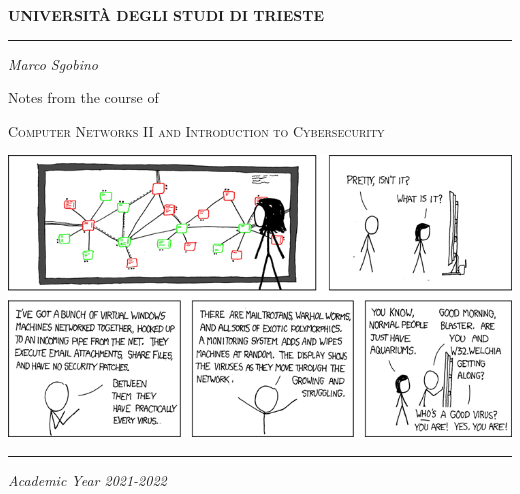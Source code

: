 \begin{titlepage}
        \begin{center}
                \Large
                \textbf{UNIVERSITÀ DEGLI STUDI DI TRIESTE}

                \par\noindent\rule{\textwidth}{0.8pt}
                \vspace*{0.6cm}

                \large
                \emph{Marco Sgobino}

                \large
                \vspace*{0.6cm}

                \Large Notes from the course of
                \vspace*{0.6cm}

                \Huge
                \textsc{Computer Networks II and Introduction to Cybersecurity}
                \vspace*{.1cm}


                \vspace*{2cm}

                \begin{center}
                        \includegraphics[width=.9\textwidth, keepaspectratio]{./pics/networks-titlepage.png}
                \end{center}

                \vfill

                \par\noindent\rule{\textwidth}{0.8pt}
                \vspace*{0.6cm}
                \large
                \emph{Academic Year 2021-2022}

        \end{center}
\end{titlepage}

